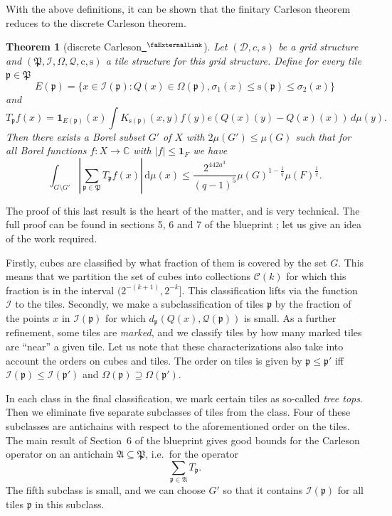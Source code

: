 \documentclass[12pt, reqno]{amsart}
\newcommand*{\complex}{\mathbb{C}} %
\newcommand{\extlink}{~\ensuremath{{}^\text{\faExternalLink}}}
\theoremstyle{definition}
\theoremstyle{plain}
\newtheorem{theorem}{Theorem}[subsection]
\newcommand{\pc}{{\mathrm{c}}}
\newcommand{\ps}{{\mathrm{s}}}
\newcommand{\fc}{{\Omega}}
\newcommand{\scI}{{\mathcal{I}}} %
\newcommand{\tQ}{{Q}}
\newcommand{\fcc}{{\mathcal{Q}}}
\newcommand{\fp}{{\mathfrak p}}
\newcommand{\fP}{{\mathfrak P}}
\begin{document}
With the above definitions, it can be shown that the finitary Carleson theorem reduces to the discrete Carleson theorem.

\begin{theorem}[discrete Carleson\href{https://github.com/fpvandoorn/carleson/blob/AFM-frozen/Carleson/Discrete/MainTheorem.lean\#L44-L48}{\extlink}]
\label{discrete-Carleson}
Let $(\mathcal{D}, c, s)$ be a grid structure and $(\fP,\scI,\fc,\fcc,\pc,\ps)$
a tile structure for this grid structure.
Define for every tile $\fp\in \fP$
\begin{equation*}
    E(\fp)=\{x\in \scI(\fp): \tQ(x)\in \fc(\fp) , {\sigma_1}(x)\le \ps(\fp)\le {\sigma_2}(x)\}
\end{equation*}
and
\begin{equation*}
    T_{\fp} f(x)= \mathbf{1}_{E(\fp)}(x) \int K_{\ps(\fp)}(x,y) f(y) e(\tQ(x)(y)-\tQ(x)(x))\, d\mu(y).
\end{equation*}
Then there exists a Borel subset $G'$ of $X$ with $2\mu(G') \leq \mu(G)$ such that for all Borel functions $f\colon X\to \complex$ with $|f|\le \mathbf{1}_F$
we have
\begin{equation*}
    \int_{G \setminus G'} \left| \sum_{\fp \in \fP} T_{\fp} f (x) \right| \, \mathrm{d}\mu(x) \le \frac{2^{442a^3}}{(q-1)^5} \mu(G)^{1-\frac{1}{q}} \mu(F)^{\frac{1}{q}}.
\end{equation*}
\end{theorem}

The proof of this last result is the heart of the matter, and is very technical.
The full proof can be found in sections 5, 6 and 7 of the blueprint \cite{CarlesonBlueprint};
let us give an idea of the work required.

Firstly, cubes are classified by what fraction of them is covered by the set $G$.
This means that we partition the set of cubes into collections $\mathcal{C}(k)$
for which this fraction is in the interval $(2^{-(k+1)},2^{-k}]$.
This classification lifts via the function $\scI$ to the tiles.
Secondly, we make a subclassification of tiles $\fp$
by the fraction of the points $x$ in $\scI(\fp)$ for which $d_{\fp}(\tQ(x),\fcc(\fp))$ is small.
As a further refinement, some tiles are \emph{marked},
and we classify tiles by how many marked tiles are ``near'' a given tile.
Let us note that these characterizations also take into account the orders on cubes and tiles.
The order on tiles is given by $\fp\le \fp'$ iff
$\scI(\fp)\le \scI(\fp')$ and $\Omega(\fp)\supseteq \Omega(\fp')$.

In each class in the final classification, we mark certain tiles as so-called \emph{tree tops}.
Then we eliminate five separate subclasses of tiles from the class.
Four of these subclasses are antichains with respect to the aforementioned order on the tiles.
The main result of Section~6 of the blueprint gives good bounds for the
Carleson operator on an antichain $\mathfrak{A}\subseteq\fP$, i.e.\ for the operator
$$\sum_{\fp\in\mathfrak{A}}T_{\fp}.$$
The fifth subclass is small, and we can choose $G'$
so that it contains $\scI(\fp)$ for all tiles $\fp$ in this subclass.
\end{document}
